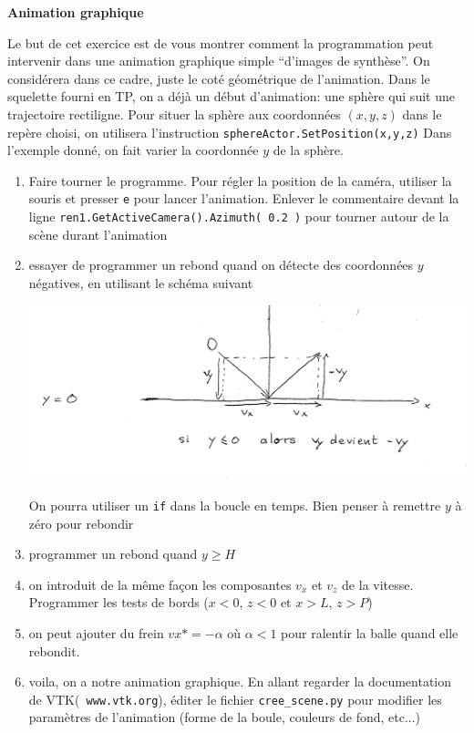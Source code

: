\documentclass[12pt]{letter}
\begin{document}
\textbf{Animation graphique}

 Le but de cet exercice est de vous montrer comment la programmation peut intervenir dans une animation graphique simple ``d'images de synthèse''.
 On considérera dans ce cadre, juste le coté géométrique de l'animation. Dans le squelette fourni en TP, on a déjà un début d'animation: 
 une sphère qui suit une trajectoire rectiligne. 
 Pour situer la sphère aux coordonnées $(x,y,z)$ dans le repère choisi, on utilisera l'instruction \texttt{sphereActor.SetPosition(x,y,z)}
 Dans l'exemple donné, on fait varier la coordonnée $y$ de la sphère. 

 \begin{enumerate} 
 
    \item Faire tourner le programme. Pour régler la position de la caméra, utiliser
    la souris et presser \texttt{e} pour lancer l'animation. Enlever le commentaire devant la ligne
    \texttt{ren1.GetActiveCamera().Azimuth( 0.2 )} pour tourner autour de la scène durant l'animation
    \item essayer de programmer un rebond quand on détecte des coordonnées $y$ négatives, en utilisant le schéma suivant 
   \begin{center}
     \includegraphics[width=0.8\linewidth]{rebond.pdf}
   \end{center}
   On pourra utiliser un \texttt{if} dans la boucle en temps. Bien penser à remettre $y$ à zéro pour rebondir
   \item programmer un rebond quand $y \geqslant H$
   \item on introduit de la même façon les composantes $v_x$ et $v_z$ de la vitesse. Programmer les tests de bords ($x <0$, $z < 0$ et $x > L$, $z > P$)
   \item on peut ajouter du frein $vx *= -\alpha$ où $\alpha < 1$ pour ralentir la balle quand elle rebondit.
   \item voila, on a notre animation graphique. En allant regarder la documentation de VTK(\texttt{ www.vtk.org}), éditer le fichier \texttt{cree\_scene.py}
   pour modifier les paramètres de l'animation (forme de la boule, couleurs de fond, etc...)
    
  \end{enumerate}
\end{document}
